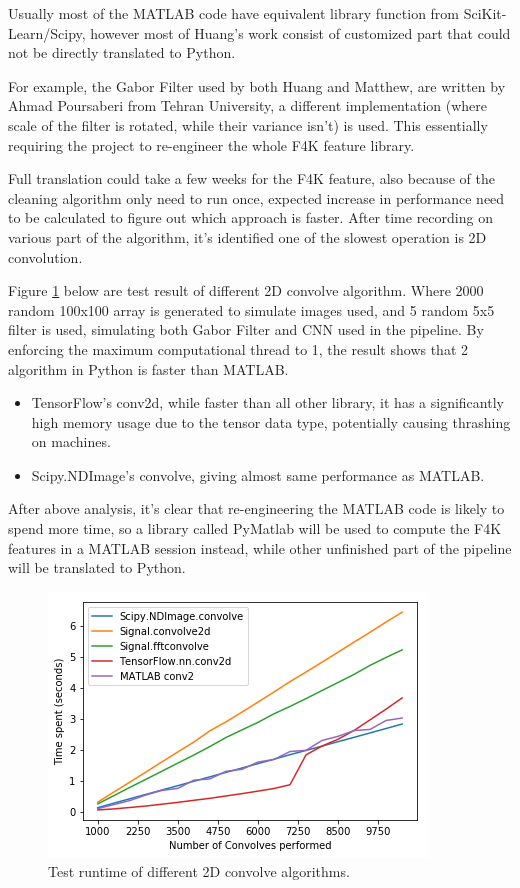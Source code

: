\documentclass[bsc,logo,twoside,fullspacing,parskip]{infthesis}
\begin{document}
Usually most of the MATLAB code have equivalent library function from SciKit-Learn/Scipy, however most of Huang's work consist of customized part that could not be directly translated to Python.

For example, the Gabor Filter used by both Huang and Matthew, are written by Ahmad Poursaberi from Tehran University, a different implementation (where scale of the filter is rotated, while their variance isn't) is used. This essentially requiring the project to re-engineer the whole F4K feature library.

Full translation could take a few weeks for the F4K feature, also because of the cleaning algorithm only need to run once, expected increase in performance need to be calculated to figure out which approach is faster. After time recording on various part of the algorithm, it's identified one of the slowest operation is 2D convolution.

Figure \ref{fig:benchmark} below are test result of different 2D convolve algorithm. Where 2000 random 100x100 array is generated to simulate images used, and 5 random 5x5 filter is used, simulating both Gabor Filter and CNN used in the pipeline. By enforcing the maximum computational thread to 1, the result shows that 2 algorithm in Python is faster than MATLAB.
\begin{itemize}
\item
TensorFlow's conv2d, while faster than all other library, it has a significantly high memory usage due to the tensor data type, potentially causing thrashing on machines.
\item
Scipy.NDImage's convolve, giving almost same performance as MATLAB.
\end{itemize}

After above analysis, it's clear that re-engineering the MATLAB code is likely to spend more time, so a library called PyMatlab will be used to compute the F4K features in a MATLAB session instead, while other unfinished part of the pipeline will be translated to Python.

\begin{figure}[!b]
    \centering
    \includegraphics[scale=0.5]{graph/benchmark.png}
    \caption{Test runtime of different 2D convolve algorithms.}
    \label{fig:benchmark}
\end{figure}
\end{document}
